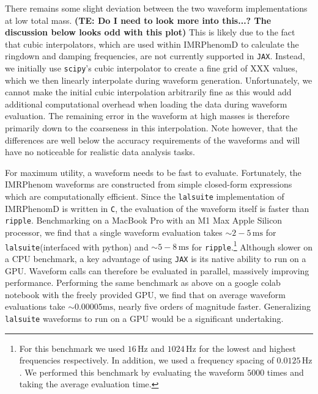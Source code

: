 \documentclass[twocolumn]{aastex631}
\newcommand{\jax}{\texttt{JAX}\xspace}
\newcommand{\ripple}{\texttt{ripple}\xspace}
\newcommand{\lalsuite}{\texttt{lalsuite}\xspace}
\newcommand{\te}[1]{\textbf{\color{pyGreen}(TE: #1)}}
\begin{document}
There remains some slight deviation between the two waveform implementations at low total mass. \te{Do I need to look more into this...? The discussion below looks odd with this plot}
This is likely due to the fact that cubic interpolators, which are used within IMRPhenomD to calculate the ringdown and damping frequencies, are not currently supported in \jax.
Instead, we initially use \texttt{scipy}'s cubic interpolator to create a fine grid of XXX values, which we then linearly interpolate during waveform generation.
Unfortunately, we cannot make the initial cubic interpolation arbitrarily fine as this would add additional computational overhead when loading the data during waveform evaluation.
The remaining error in the waveform at high masses is therefore primarily down to the coarseness in this interpolation.
Note however, that the differences are well below the accuracy requirements of the waveforms and will have no noticeable for realistic data analysis tasks.

For maximum utility, a waveform needs to be fast to evaluate.
Fortunately, the IMRPhenom waveforms are constructed from simple closed-form expressions which are computationally efficient.
Since the \lalsuite implementation of IMRPhenomD is written in \texttt{C}, the evaluation of the waveform itself is faster than \ripple.
Benchmarking on a MacBook Pro with an M1 Max Apple Silicon processor, we find that a single waveform evaluation takes $\sim 2-5\,\mathrm{ms}$ for \lalsuite (interfaced with python) and $\sim 5-8\,\mathrm{ms}$ for \ripple.\footnote{
    For this benchmark we used $16\,\mathrm{Hz}$ and $1024\,\mathrm{Hz}$ for the lowest and highest frequencies respectively. 
    In addition, we used a frequency spacing of $0.0125\,\mathrm{Hz}$. 
    We performed this benchmark by evaluating the waveform $5000$ times and taking the average evaluation time.
}
Although slower on a CPU benchmark, a key advantage of using \jax is its native ability to run on a GPU.
Waveform calls can therefore be evaluated in parallel, massively improving performance.
Performing the same benchmark as above on a google colab notebook with the freely provided GPU, we find that on average waveform evaluations take $\sim 0.00005\mathrm{ms}$, nearly five orders of magnitude faster.
Generalizing \lalsuite waveforms to run on a GPU would be a significant undertaking.
\end{document}
